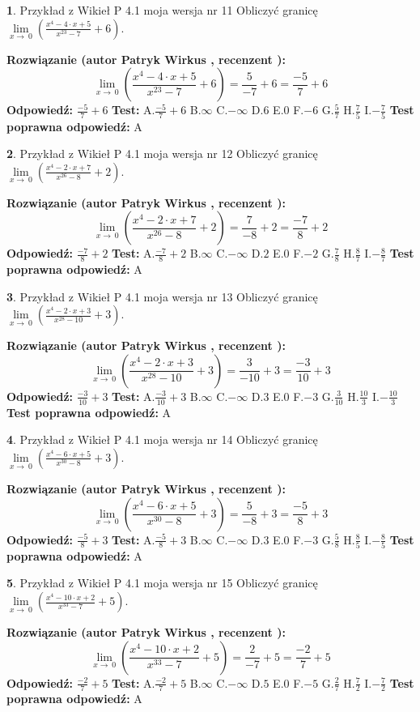 \documentclass[12pt, a4paper]{article}
\theoremstyle{definition} %
\newtheorem{zad}{}
\newcommand{\zadStart}[1]{\begin{zad}#1\newline}
\newcommand{\zadStop}{\end{zad}}
\newcommand{\rozwStart}[2]{\noindent \textbf{Rozwiązanie (autor #1 , recenzent #2): }\newline}
\newcommand{\rozwStop}{\newline}
\newcommand{\odpStart}{\noindent \textbf{Odpowiedź:}\newline}
\newcommand{\odpStop}{\newline}
\newcommand{\testStart}{\noindent \textbf{Test:}\newline}
\newcommand{\testStop}{\newline}
\newcommand{\kluczStart}{\noindent \textbf{Test poprawna odpowiedź:}\newline}
\newcommand{\kluczStop}{\newline}
\begin{document}
\zadStart{Przykład z Wikieł P 4.1 moja wersja nr 11}
Obliczyć granicę $\lim\limits_{x\to\ 0}(\frac{x^{4}-4 \cdot x +5}{x^{23}-7}+6)$.
\zadStop
\rozwStart{Patryk Wirkus}{}
$$\lim\limits_{x\to\ 0}(\frac{x^{4}-4 \cdot x +5}{x^{23}-7}+6)=\frac{5}{-7}+6=\frac{-5}{7}+6$$
\rozwStop
\odpStart
$\frac{-5}{7}+6$
\odpStop
\testStart
A.$\frac{-5}{7}+6$
B.$\infty$
C.$-\infty$
D.$6$
E.$0$
F.$-6$
G.$\frac{5}{7}$
H.$\frac{7}{5}$
I.$-\frac{7}{5}$
\testStop
\kluczStart
A
\kluczStop



\zadStart{Przykład z Wikieł P 4.1 moja wersja nr 12}
Obliczyć granicę $\lim\limits_{x\to\ 0}(\frac{x^{4}-2 \cdot x +7}{x^{26}-8}+2)$.
\zadStop
\rozwStart{Patryk Wirkus}{}
$$\lim\limits_{x\to\ 0}(\frac{x^{4}-2 \cdot x +7}{x^{26}-8}+2)=\frac{7}{-8}+2=\frac{-7}{8}+2$$
\rozwStop
\odpStart
$\frac{-7}{8}+2$
\odpStop
\testStart
A.$\frac{-7}{8}+2$
B.$\infty$
C.$-\infty$
D.$2$
E.$0$
F.$-2$
G.$\frac{7}{8}$
H.$\frac{8}{7}$
I.$-\frac{8}{7}$
\testStop
\kluczStart
A
\kluczStop



\zadStart{Przykład z Wikieł P 4.1 moja wersja nr 13}
Obliczyć granicę $\lim\limits_{x\to\ 0}(\frac{x^{4}-2 \cdot x +3}{x^{28}-10}+3)$.
\zadStop
\rozwStart{Patryk Wirkus}{}
$$\lim\limits_{x\to\ 0}(\frac{x^{4}-2 \cdot x +3}{x^{28}-10}+3)=\frac{3}{-10}+3=\frac{-3}{10}+3$$
\rozwStop
\odpStart
$\frac{-3}{10}+3$
\odpStop
\testStart
A.$\frac{-3}{10}+3$
B.$\infty$
C.$-\infty$
D.$3$
E.$0$
F.$-3$
G.$\frac{3}{10}$
H.$\frac{10}{3}$
I.$-\frac{10}{3}$
\testStop
\kluczStart
A
\kluczStop



\zadStart{Przykład z Wikieł P 4.1 moja wersja nr 14}
Obliczyć granicę $\lim\limits_{x\to\ 0}(\frac{x^{4}-6 \cdot x +5}{x^{30}-8}+3)$.
\zadStop
\rozwStart{Patryk Wirkus}{}
$$\lim\limits_{x\to\ 0}(\frac{x^{4}-6 \cdot x +5}{x^{30}-8}+3)=\frac{5}{-8}+3=\frac{-5}{8}+3$$
\rozwStop
\odpStart
$\frac{-5}{8}+3$
\odpStop
\testStart
A.$\frac{-5}{8}+3$
B.$\infty$
C.$-\infty$
D.$3$
E.$0$
F.$-3$
G.$\frac{5}{8}$
H.$\frac{8}{5}$
I.$-\frac{8}{5}$
\testStop
\kluczStart
A
\kluczStop



\zadStart{Przykład z Wikieł P 4.1 moja wersja nr 15}
Obliczyć granicę $\lim\limits_{x\to\ 0}(\frac{x^{4}-10 \cdot x +2}{x^{33}-7}+5)$.
\zadStop
\rozwStart{Patryk Wirkus}{}
$$\lim\limits_{x\to\ 0}(\frac{x^{4}-10 \cdot x +2}{x^{33}-7}+5)=\frac{2}{-7}+5=\frac{-2}{7}+5$$
\rozwStop
\odpStart
$\frac{-2}{7}+5$
\odpStop
\testStart
A.$\frac{-2}{7}+5$
B.$\infty$
C.$-\infty$
D.$5$
E.$0$
F.$-5$
G.$\frac{2}{7}$
H.$\frac{7}{2}$
I.$-\frac{7}{2}$
\testStop
\kluczStart
A
\kluczStop
\end{document}
